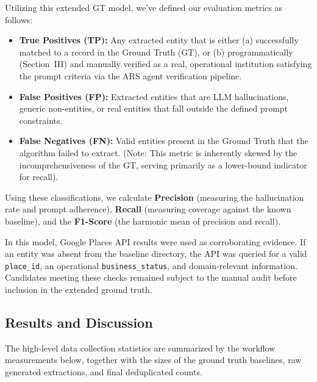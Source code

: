 \documentclass[12pt,oneside]{report}
\begin{document}
Utilizing this extended GT model, we've defined our evaluation metrics as follows:

\begin{itemize}
    \item \textbf{True Positives (TP):} Any extracted entity that is either (a) successfully matched to a record in the Ground Truth (GT), or (b) programmatically (Section~III) and manually verified as a real, operational institution satisfying the prompt criteria via the ARS agent verification pipeline.
    \item \textbf{False Positives (FP):} Extracted entities that are LLM hallucinations, generic non-entities, or real entities that fall outside the defined prompt constraints.
    \item \textbf{False Negatives (FN):} Valid entities present in the Ground Truth that the algorithm failed to extract. (Note: This metric is inherently skewed by the incomprehensiveness of the GT, serving primarily as a lower-bound indicator for recall).
\end{itemize}

Using these classifications, we calculate \textbf{Precision} (measuring the hallucination rate and prompt adherence), \textbf{Recall} (measuring coverage against the known baseline), and the \textbf{F1-Score} (the harmonic mean of precision and recall).

In this model, Google Places API results were used as corroborating evidence. If an entity was absent from the baseline directory, the API was queried for a valid \texttt{place\_id}, an operational \texttt{business\_status}, and domain-relevant information. Candidates meeting these checks remained subject to the manual audit before inclusion in the extended ground truth.

\subsection{Results and Discussion}
The high-level data collection statistics are summarized by the workflow measurements below, together with the sizes of the ground truth baselines, raw generated extractions, and final deduplicated counts.
\end{document}
